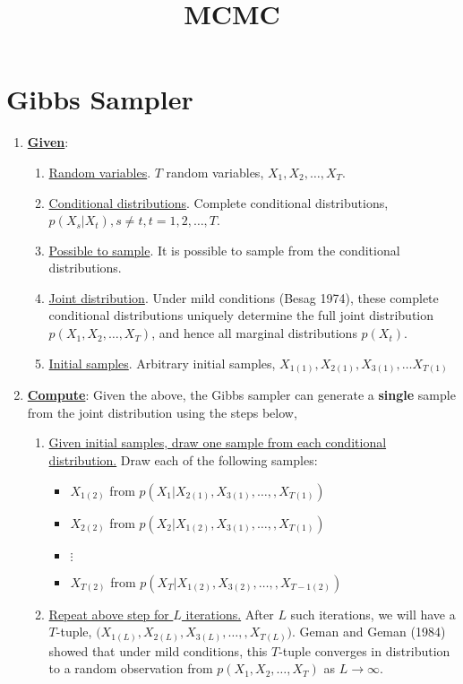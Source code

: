 \documentclass{article}
\title{MCMC}
\begin{document}
\date{}
\maketitle

\section{Gibbs Sampler}
\vspace{0.5in}
\begin{enumerate}
\item \textbf{\underline{Given}}:
\begin{enumerate}
\item \underline{Random variables}.  $T$ random variables, $X_1, X_2, \ldots, X_T$.
\item \underline{Conditional distributions}.  Complete conditional distributions, $p(X_s|X_t), s \neq t, t=1, 2, \ldots, T$.
\item \underline{Possible to sample}.  It is possible to sample from the conditional distributions.
\item \underline{Joint distribution}.  Under mild conditions (Besag 1974), these complete conditional distributions uniquely determine the full joint distribution $p(X_1, X_2, \ldots, X_T)$, and hence all marginal distributions $p(X_t)$.
\item \underline{Initial samples}. Arbitrary initial samples, $X_{1(1)}, X_{2(1)}, X_{3(1)}, \ldots X_{T(1)}$
\end{enumerate}

\vspace{0.5in}
\item \textbf{\underline{Compute}}:
Given the above, the Gibbs sampler can generate a \textbf{single} sample from the joint distribution using the steps below,

\begin{enumerate}
\item \underline{Given initial samples, draw one sample from each conditional distribution.} Draw each of the following samples:
\begin{itemize}
\item $X_{1(2)}$ from $p(X_1  |  X_{2(1)}, X_{3(1)}, \ldots, , X_{T(1)})$
\item $X_{2(2)}$ from $p(X_2  |  X_{1(2)}, X_{3(1)}, \ldots, , X_{T(1)})$
\item $\vdots$
\item $X_{T(2)}$ from $p(X_T  |  X_{1(2)}, X_{3(2)}, \ldots, , X_{{T-1}(2)})$
\end{itemize}
\item \underline{Repeat above step for $L$ iterations.}  After $L$ such iterations, we will have a $T$-tuple, $\big(X_{1(L)}, X_{2(L)}, X_{3(L)}, \ldots, , X_{T(L)}\big)$.  Geman and Geman (1984) showed that under mild conditions, this $T$-tuple converges in distribution to a random observation from $p(X_1, X_2, \ldots, X_T)$ as $L \rightarrow \infty$.
\end{enumerate}
\end{enumerate}
\end{document}
